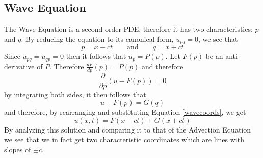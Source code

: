 \subsection{Wave Equation}
The Wave Equation is a second order PDE, therefore it has two characteristics: $p$ and $q$. By reducing the equation to its canonical form, $u_{pq} = 0$, we see that
\begin{equation} \label{wavecoords}
p = x-ct \qquad \text{and} \qquad q = x + ct
\end{equation}
Since $u_{pq} = u_{qp} = 0$ then it follows that $u_p = P(p)$. Let $F(p)$ be an anti-derivative of $P$. Therefore $\frac{dF}{dp}(p) = P(p)$ and therefore
\begin{equation}
\frac{\partial}{\partial p}(u - F(p)) = 0
\end{equation}
by integrating both sides, it then follows that
\begin{equation}
u - F(p) = G(q)
\end{equation}
and therefore, by rearranging and substituting Equation \ref{wavecoords}, we get
\begin{equation}
u(x,t) = F(x-ct) + G(x+ct)
\end{equation}
By analyzing this solution and comparing it to that of the Advection Equation we see that we in fact get two characteristic coordinates which are lines with slopes of $\pm c$.
